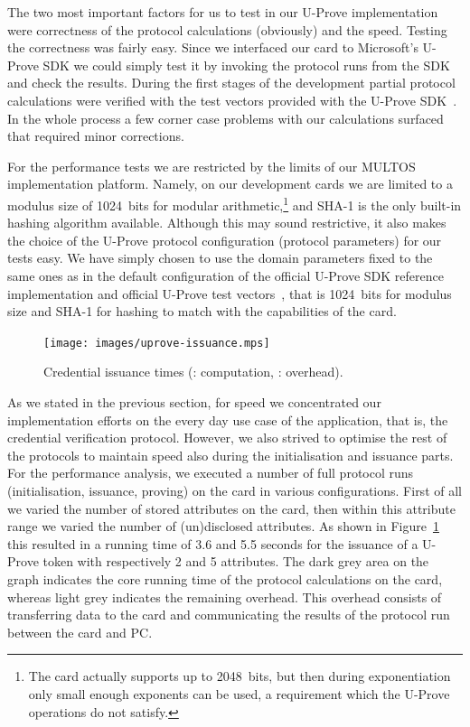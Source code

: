 The two most important factors for us to test in our U-Prove implementation were
correctness of the protocol calculations (obviously) and the speed. Testing the
correctness was fairly easy. Since we interfaced our card to Microsoft's U-Prove
SDK we could simply test it by invoking the protocol runs from the SDK and check
the results. During the first stages of the development partial protocol
calculations were verified with the test vectors provided with the U-Prove
SDK~\cite{U-Prove_Vectors2011}. In the whole process a few corner case problems
with our calculations surfaced that required minor corrections.

For the performance tests we are restricted by the limits of our MULTOS
implementation platform. Namely, on our development cards we are limited to a
modulus size of 1024~bits for modular arithmetic,\footnote{The card actually
supports up to 2048~bits, but then during exponentiation only small enough
exponents can be used, a requirement which the U-Prove operations do not
satisfy.} and SHA-1 is the only built-in hashing algorithm available. Although
this may sound restrictive, it also makes the choice of the U-Prove protocol
configuration (protocol parameters) for our tests easy. We have simply chosen to
use the domain parameters fixed to the same ones as in the default configuration
of the official U-Prove SDK reference implementation and official U-Prove test
vectors~\cite{U-Prove_Vectors2011}, that is 1024~bits for modulus size and SHA-1
for hashing to match with the capabilities of the card.

\begin{figure}
  \centering
  \texttt{[image: images/uprove-issuance.mps]}
  \caption[Credential issuance times.]{
    Credential issuance times
    (: computation,
      : overhead).}
  \label{fig:issue}
\end{figure}

As we stated in the previous section, for speed we concentrated our
implementation efforts on the every day use case of the application, that is,
the credential verification protocol. However, we also strived to optimise the
rest of the protocols to maintain speed also during the initialisation and
issuance parts. For the performance analysis, we executed a number of full
protocol runs (initialisation, issuance, proving) on the card in various
configurations. First of all we varied the number of stored attributes on the
card, then within this attribute range we varied the number of (un)disclosed
attributes. As shown in Figure~\ref{fig:issue} this resulted in a running time
of 3.6 and 5.5 seconds for the issuance of a U-Prove token with respectively 2
and 5 attributes. The dark grey area on the graph indicates the core running
time of the protocol calculations on the card, whereas light grey indicates the
remaining overhead. This overhead consists of transferring data to the card and
communicating the results of the protocol run between the card and PC.

